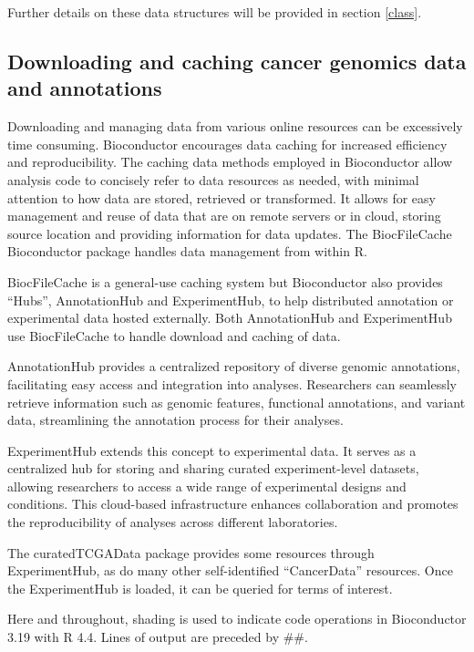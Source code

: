 \documentclass[graybox]{svmult}
\begin{document}
Further details on these data structures will be provided in section \ref{class}.

\subsection{Downloading and caching cancer genomics data and annotations}\label{cache}

Downloading and managing data from various online resources
can be excessively time consuming. Bioconductor encourages data caching for
increased efficiency and reproducibility. The caching data methods
employed in Bioconductor
allow analysis code to
concisely refer to data resources as needed, with minimal attention to how
data are stored, retrieved or transformed.
It allows for easy management and reuse of data that are on remote
servers or in cloud, storing source
location and providing information for data updates. The BiocFileCache
Bioconductor package handles data management from within R.

BiocFileCache is a general-use caching system but Bioconductor also provides
``Hubs'', AnnotationHub and ExperimentHub, to help distributed annotation or
experimental data hosted externally. Both AnnotationHub and ExperimentHub use
BiocFileCache to handle download and caching of data.

AnnotationHub provides a centralized repository of diverse genomic annotations,
facilitating easy access and integration into analyses. Researchers can
seamlessly retrieve information such as genomic features, functional
annotations, and variant data, streamlining the annotation process for their
analyses.

ExperimentHub extends this concept to experimental data. It serves as a
centralized hub for storing and sharing curated experiment-level datasets,
allowing researchers to access a wide range of experimental designs and
conditions. This cloud-based infrastructure enhances collaboration and promotes
the reproducibility of analyses across different laboratories.

The curatedTCGAData package provides some resources through
ExperimentHub, as do many other self-identified ``CancerData'' resources. Once the
ExperimentHub is loaded, it can be queried for terms of interest.

Here and throughout, shading is used to indicate code
operations in Bioconductor 3.19 with R 4.4.  Lines
of output are preceded by \#\#.
\end{document}
